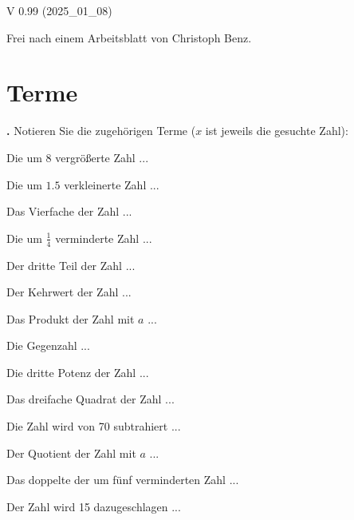 
\renewcommand{\bbwAufgabenBlockID}{Gl1LinTxt}

\renewcommand{\metaHeaderLine}{Textaufgaben}
\renewcommand{\arbeitsblattTitel}{Textaufgaben zu linearen Gleichungen}


\arbeitsblattHeader{}

\begin{center}V 0.99 (2025\_01\_08) \end{center}

{\tiny{Frei nach einem Arbeitsblatt von Christoph Benz.}}


\section{Terme}

\textbf{\bbwAufgabenNummer{}.}
Notieren Sie die zugehörigen Terme ($x$ ist jeweils die gesuchte Zahl):


\begin{bbwAufgabenBlock}
\item Die um $8$ vergrößerte Zahl ... 
\item Die um $1.5$ verkleinerte Zahl ... 
\item Das Vierfache der Zahl ... 
\item Die um $\frac14$ verminderte Zahl ... 
\item Der dritte Teil der Zahl ... 
\item Der Kehrwert der Zahl ... 
\item Das Produkt der Zahl mit $a$ ... 
\item Die Gegenzahl ... 
\item Die dritte Potenz der Zahl ... 
\item Das dreifache Quadrat der Zahl ... 
\item Die Zahl wird von 70 subtrahiert ... 
\item Der Quotient der Zahl mit $a$ ... 
\item Das doppelte der um fünf verminderten Zahl
... 
\item Der Zahl wird 15 dazugeschlagen ... 
\end{bbwAufgabenBlock}

